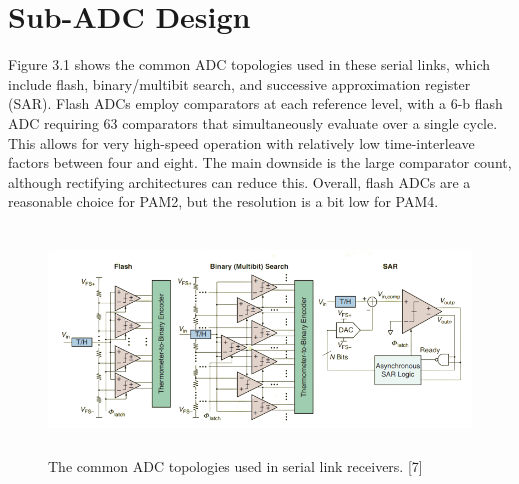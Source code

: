 
\chapter{Sub-ADC Design}
\graphicspath{{Sub-ADC Design/Vector/}{Sub-ADC Design/}}

Figure 3.1 shows the common ADC 
topologies used in these serial links, 
which include flash, binary/multibit 
search, and successive approximation 
register (SAR). Flash ADCs employ 
comparators at each reference level, 
with a 6-b flash ADC requiring 63 comparators that simultaneously evaluate 
over a single cycle. This allows for very 
high-speed operation with relatively 
low time-interleave factors between 
four and eight. The main downside is the large comparator count, although 
rectifying architectures can reduce 
this. Overall, flash ADCs are a reasonable choice for PAM2, but the resolution is a bit low for PAM4.\\

\begin{figure}
	\centering
	\includegraphics[width=12cm,height=6cm]{fig3_1.png}
	\caption{The common ADC topologies used in serial link receivers. [7]}
	\label{adc_topo}
\end{figure}

